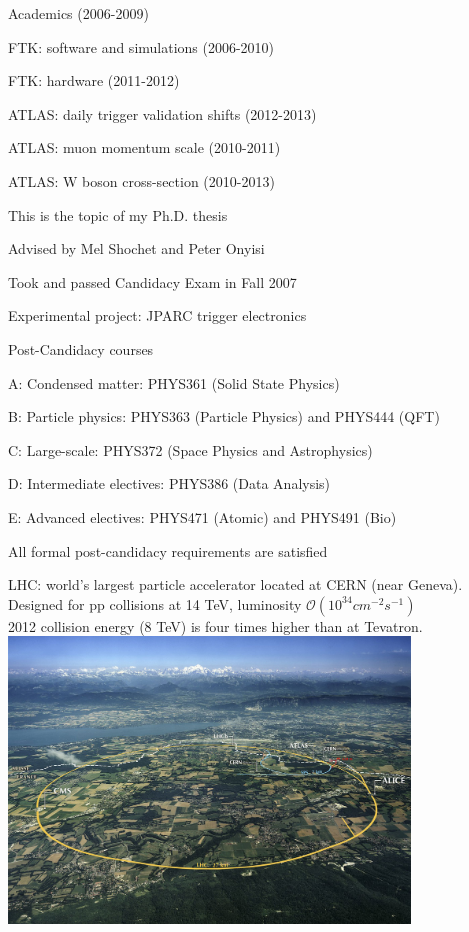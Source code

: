 {
\iteb
\item Academics (2006-2009)
\item FTK: software and simulations (2006-2010)
\item FTK: hardware (2011-2012)
\item ATLAS: daily trigger validation shifts (2012-2013)
\item ATLAS: muon momentum scale (2010-2011)
\item ATLAS: W boson cross-section (2010-2013)
\iteb
\item This is the topic of my Ph.D. thesis
\item Advised by Mel Shochet and Peter Onyisi
\itee
\itee
}

{
\iteb
\item Took and passed Candidacy Exam in Fall 2007
\item Experimental project: JPARC trigger electronics
\item Post-Candidacy courses
\iteb
\item A: Condensed matter: PHYS361 (Solid State Physics)
\item B: Particle physics: PHYS363 (Particle Physics) and PHYS444 (QFT)
\item C: Large-scale: PHYS372 (Space Physics and Astrophysics)
\item D: Intermediate electives: PHYS386 (Data Analysis)
\item E: Advanced electives: PHYS471 (Atomic) and PHYS491 (Bio)
\itee
\item All formal post-candidacy requirements are satisfied
\itee
}

{
\centering
LHC: world's largest particle accelerator located at CERN (near Geneva). \\
Designed for pp collisions at 14 TeV, luminosity $\mathcal{O}(10^{34}cm^{-2}s^{-1})$ \\
2012 collision energy (8 TeV) is four times higher than at Tevatron.
\includegraphics[width=0.8\textwidth]{dates/mtg/figures/atlas/LHC}

}

